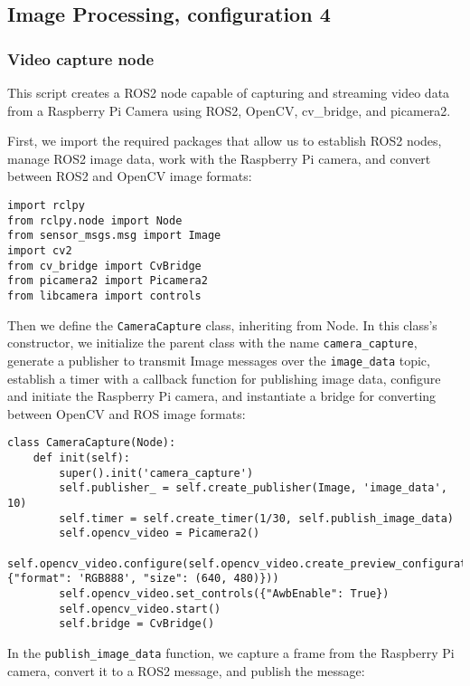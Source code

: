 \newpage
\subsection{Image Processing, configuration 4}\label{ros2nodeC4}

\subsubsection{Video capture node}

This script creates a ROS2 node capable of capturing and streaming video data from a Raspberry Pi Camera using ROS2, OpenCV, cv\_bridge, and picamera2. 

First, we import the required packages that allow us to establish ROS2 nodes, manage ROS2 image data, work with the Raspberry Pi camera, and convert between ROS2 and OpenCV image formats:

\begin{lstlisting}[language=PythonPlus]
import rclpy
from rclpy.node import Node
from sensor_msgs.msg import Image
import cv2
from cv_bridge import CvBridge
from picamera2 import Picamera2
from libcamera import controls
\end{lstlisting}

Then we define the \verb|CameraCapture| class, inheriting from Node. In this class's constructor, we initialize the parent class with the name \verb|camera_capture|, generate a publisher to transmit Image messages over the \verb|image_data| topic, establish a timer with a callback function for publishing image data, configure and initiate the Raspberry Pi camera, and instantiate a bridge for converting between OpenCV and ROS image formats:

\begin{lstlisting}[language=PythonPlus]
class CameraCapture(Node):
    def init(self):
        super().init('camera_capture')
        self.publisher_ = self.create_publisher(Image, 'image_data', 10)
        self.timer = self.create_timer(1/30, self.publish_image_data)
        self.opencv_video = Picamera2()
        self.opencv_video.configure(self.opencv_video.create_preview_configuration(main={"format": 'RGB888', "size": (640, 480)}))
        self.opencv_video.set_controls({"AwbEnable": True})
        self.opencv_video.start()
        self.bridge = CvBridge()
\end{lstlisting}

In the \verb|publish_image_data| function, we capture a frame from the Raspberry Pi camera, convert it to a ROS2 message, and publish the message:

